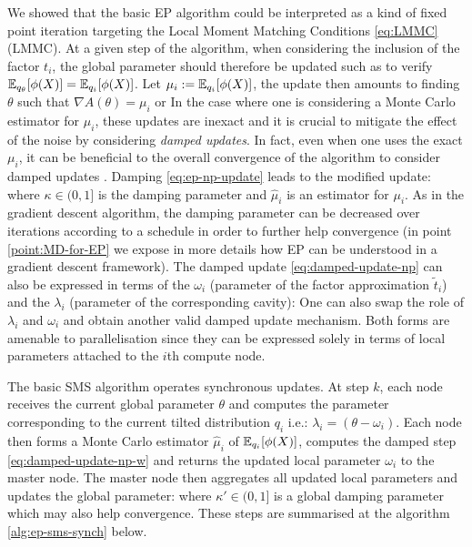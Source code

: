 We showed that the basic EP algorithm could be interpreted as a kind of fixed point iteration targeting the Local Moment Matching Conditions \eqref{eq:LMMC} (LMMC). At a given step of the algorithm, when considering the inclusion of the factor $t_i$, the global parameter should therefore be updated such as to verify $\mathbb E_{q_\theta}[\phi(X)]= \mathbb E_{q_i}[\phi(X)]$. Let $\mu_i:=\mathbb E_{q_i}[\phi(X)]$, the update then amounts to finding $\theta$ such that $\nabla A(\theta) = \mu_i$ or
%
%
In the case where one is considering a Monte Carlo estimator for $\mu_i$, these updates are inexact and it is crucial to mitigate the effect of the noise by considering \emph{damped updates}. In fact, even when one uses the exact $\mu_i$, it can be beneficial to the overall convergence of the algorithm to consider damped updates \citep{heskes03}. Damping \eqref{eq:ep-np-update} leads to the modified update:
%
%
where $\kappa \in(0,1]$ is the damping parameter and $\hat\mu_i$ is an estimator for $\mu_i$. As in the gradient descent algorithm, the damping parameter can be decreased over iterations according to a schedule in order to further help convergence (in point \ref{point:MD-for-EP} we expose in more details how EP can be understood in a gradient descent framework).
The damped update \eqref{eq:damped-update-np} can also be expressed in terms of the $\omega_i$ (parameter of the factor approximation $\tilde t_i$) and the $\lambda_i$ (parameter of the corresponding cavity):
%
%
One can also swap the role of $\lambda_i$ and $\omega_i$ and obtain another valid damped update mechanism. Both forms are amenable to parallelisation since they can be expressed solely in terms of local parameters attached to the $i$th compute node.

The basic SMS algorithm operates synchronous updates.
At step $k$, each node receives the current global parameter $\theta$ and computes the parameter corresponding to the current tilted distribution $q_i$ i.e.: $\lambda_i=(\theta-\omega_i)$. Each node then forms a Monte Carlo estimator $\hat\mu_i$ of $\mathbb E_{q_i}[\phi(X)]$, computes the damped step \eqref{eq:damped-update-np-w} and returns the updated local parameter $\omega_i$ to the master node. 
The master node then aggregates all updated local parameters and updates the global parameter: 
%
%
where $\kappa' \in (0,1]$ is a global damping parameter which may also help convergence. 
These steps are summarised at the algorithm \ref{alg:ep-sms-synch} below.

